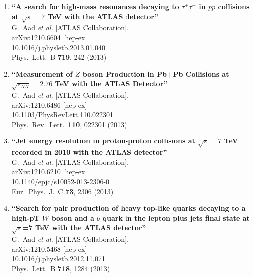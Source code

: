 \documentclass{article}
\begin{document}
\begin{enumerate}
\item%
{\bf ``A search for high-mass resonances decaying to $\tau^+\tau^-$ in $pp$ collisions at $\sqrt{s}=7$ TeV with the ATLAS detector''}
  \\{}G.~Aad {\it et al.}  [ATLAS Collaboration].
  \\{}arXiv:1210.6604 [hep-ex]
    \\{}10.1016/j.physletb.2013.01.040
\\{}Phys.\ Lett.\ B {\bf 719}, 242 (2013) %


\item%
{\bf ``Measurement of $Z$ boson Production in Pb+Pb Collisions at $\sqrt{s_{NN}}=2.76$ TeV with the ATLAS Detector''}
  \\{}G.~Aad {\it et al.}  [ATLAS Collaboration].
  \\{}arXiv:1210.6486 [hep-ex]
    \\{}10.1103/PhysRevLett.110.022301
\\{}Phys.\ Rev.\ Lett.\  {\bf 110}, 022301 (2013) %


\item%
{\bf ``Jet energy resolution in proton-proton collisions at $\sqrt{s}=7$ TeV recorded in 2010 with the ATLAS detector''}
  \\{}G.~Aad {\it et al.}  [ATLAS Collaboration].
  \\{}arXiv:1210.6210 [hep-ex]
    \\{}10.1140/epjc/s10052-013-2306-0
\\{}Eur.\ Phys.\ J.\ C {\bf 73}, 2306 (2013) %


\item%
{\bf ``Search for pair production of heavy top-like quarks decaying to a high-pT $W$ boson and a $b$ quark in the lepton plus jets final state at $\sqrt{s}$=7 TeV with the ATLAS detector''}
  \\{}G.~Aad {\it et al.}  [ATLAS Collaboration].
  \\{}arXiv:1210.5468 [hep-ex]
    \\{}10.1016/j.physletb.2012.11.071
\\{}Phys.\ Lett.\ B {\bf 718}, 1284 (2013) %



\end{enumerate}
\end{document}
